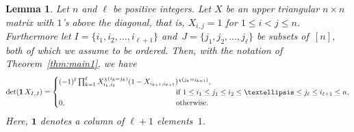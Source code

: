 \documentclass[10pt,a4paper]{amsart}
\newtheorem{lemma}{Lemma}
\begin{document}
\begin{lemma} \label{lem:X2}
Let $n$ and $\ell$ be positive integers.
Let $X$ be an upper triangular $n\times n$ matrix with $1$'s above
the diagonal, that is, $X_{i,j}=1$ for $1\le i<j\le n$.
Furthermore let $I=\{i_1,i_2,\dots,i_{\ell+1}\}$
and~$J=\{j_1,j_2,\dots,j_\ell\}$
be subsets of\/~$[n]$, both of which we assume to
be ordered.
Then, with the notation of Theorem~\ref{thm:main1}, we have
\begin{equation} \label{eq:X2} 
\det(\mathbf 1\,X_{I,J})=\begin{cases}
(-1)^\ell\prod _{k=1} ^{\ell}X_{i_k,i_k}^{\chi(i_k=j_k)}
(1-X_{i_{k+1},i_{k+1}})^{\chi(j_{k}=i_{k+1})},&\\
&\kern-2cm
\text{if }1\le i_1\le j_1\le i_2\le\dots\le j_\ell\le i_{\ell+1}\le n,\\
0,&\kern-2cm\text{otherwise}.
\end{cases}
\end{equation}
Here, $\mathbf1$ denotes a column of $\ell+1$ elements~$1$.
\end{lemma} 
\end{document}
